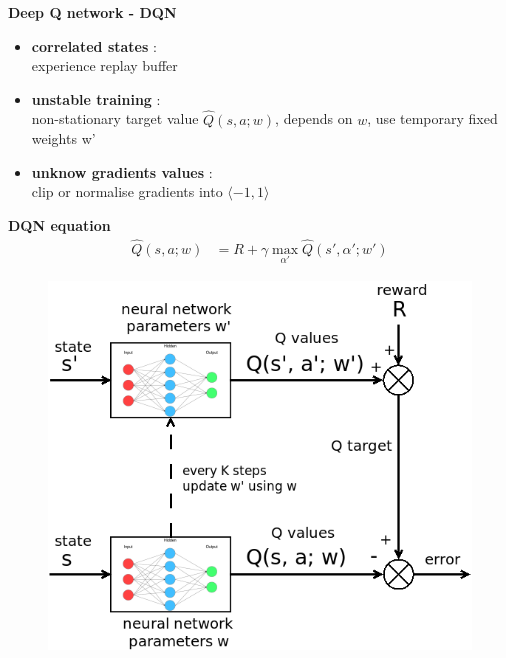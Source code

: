 \documentclass[xcolor=dvipsnames]{beamer}
\begin{document}
\begin{frame}{\bf Deep Q network - DQN}

\begin{itemize}
\item {\bf \color{red} correlated states} : \\
    experience replay buffer\\
\item {\bf \color{red} unstable training} : \\
    non-stationary target value $\hat{Q}(s, a; w)$, depends on $w$, use temporary fixed weights w' \\
\item {\bf \color{red} unknow gradients values} : \\
    clip or normalise gradients into $\langle -1, 1 \rangle$
\end{itemize}
{\bf DQN equation}
\begin{align*}
  \hat{Q}(s, a; w) &= R + \gamma \max \limits_{\alpha'} \hat{Q}(s', \alpha'; w')
  \label{eq:dqn}
\end{align*}



\begin{figure}[!htb]
  \centering
  \includegraphics[scale=0.16]{./diagrams/dqn.png}
  \label{img:dqn}
\end{figure}


\end{frame}
\end{document}
